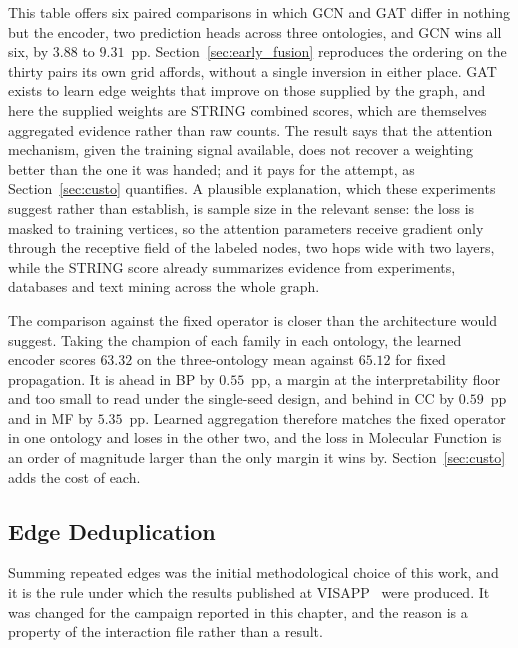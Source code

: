 \documentclass[Ingles]{ic-tese-v3}
\begin{document}
This table offers six paired comparisons in which GCN and GAT differ in nothing but the
encoder, two prediction heads across three ontologies, and GCN wins all six, by
$3.88$ to $9.31$~pp. Section~\ref{sec:early_fusion} reproduces the ordering on the thirty
pairs its own grid affords, without a single inversion in either place.
GAT exists to learn edge weights that improve on those
supplied by the graph, and here the supplied weights are STRING combined scores, which are
themselves aggregated evidence rather than raw counts. The result says that the attention
mechanism, given the training signal available, does not recover a weighting better than
the one it was handed; and it pays for the attempt, as Section~\ref{sec:custo} quantifies.
A plausible explanation, which these experiments suggest rather than establish, is sample size in the relevant sense: the loss is masked to training vertices, so the attention parameters receive gradient only through the receptive field of the labeled nodes, two hops wide with two layers, while the STRING score already summarizes evidence from experiments, databases and text mining across the whole graph.

The comparison against the fixed operator is closer than the architecture would suggest.
Taking the champion of each family in each ontology, the learned encoder scores $63.32$ on
the three-ontology mean against $65.12$ for fixed propagation. It is ahead in BP by
$0.55$~pp, a margin at the interpretability floor and too small to read under the single-seed
design, and behind in CC by $0.59$~pp and in MF by $5.35$~pp. Learned aggregation therefore matches the fixed operator in one ontology
and loses in the other two, and the loss in Molecular Function is an order of magnitude
larger than the only margin it wins by. Section~\ref{sec:custo} adds the cost of each.

\subsection{Edge Deduplication}
\label{sec:dedup}

Summing repeated edges was the initial methodological choice of this work, and it is the
rule under which the results published at VISAPP~\cite{mauhnoom2026graphs} were produced. It
was changed for the campaign reported in this chapter, and the reason is a property of the
interaction file rather than a result.
\end{document}

